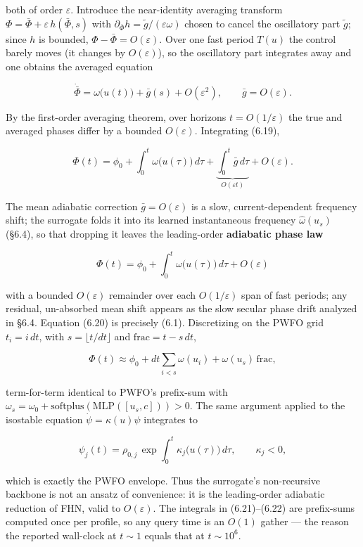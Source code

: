 \documentclass[
  11pt,
]{article}
\providecommand{\lt}{<}
\providecommand{\gt}{>}
\begin{document}
both of order \(\varepsilon\). Introduce the near-identity averaging
transform \(\Phi=\bar\Phi+\varepsilon\,h(\bar\Phi,s)\) with
\(\partial_{\bar\Phi}h=\tilde g/(\varepsilon\omega)\) chosen to cancel
the oscillatory part \(\tilde g\); since \(h\) is bounded,
\(\Phi-\bar\Phi=O(\varepsilon)\). Over one fast period \(T(u)\) the
control barely moves (it changes by \(O(\varepsilon)\)), so the
oscillatory part integrates away and one obtains the averaged equation

\[
\dot{\bar\Phi}=\omega\big(u(t)\big)+\bar g(s)+O(\varepsilon^2),\qquad \bar g=O(\varepsilon).
\tag{6.19}
\]

By the first-order averaging theorem, over horizons
\(t=O(1/\varepsilon)\) the true and averaged phases differ by a bounded
\(O(\varepsilon)\). Integrating (6.19),

\[
\Phi(t)=\phi_0+\int_0^t\omega\big(u(\tau)\big)\,d\tau
+\underbrace{\int_0^t\bar g\,d\tau}_{O(\varepsilon t)}+O(\varepsilon).
\]

The mean adiabatic correction \(\bar g=O(\varepsilon)\) is a slow,
current-dependent frequency shift; the surrogate folds it into its
learned instantaneous frequency \(\hat\omega(u_s)\) (§6.4), so that
dropping it leaves the leading-order \textbf{adiabatic phase law}

\[
\boxed{\ \Phi(t)=\phi_0+\int_0^t \omega\big(u(\tau)\big)\,d\tau+O(\varepsilon)\ }
\tag{6.20}
\]

with a bounded \(O(\varepsilon)\) remainder over each
\(O(1/\varepsilon)\) span of fast periods; any residual, un-absorbed
mean shift appears as the slow secular phase drift analyzed in §6.4.
Equation (6.20) is precisely (6.1). Discretizing on the PWFO grid
\(t_i=i\,dt\), with \(s=\lfloor t/dt\rfloor\) and
\(\mathrm{frac}=t-s\,dt\),

\[
\Phi(t)\approx\phi_0+dt\sum_{i\lt s}\omega(u_i)+\omega(u_s)\,\mathrm{frac},
\tag{6.21}
\]

term-for-term identical to PWFO's prefix-sum with
\(\omega_s=\omega_0+\mathrm{softplus}(\mathrm{MLP}([u_s,c]))\gt 0\). The
same argument applied to the isostable equation
\(\dot\psi=\kappa(u)\psi\) integrates to

\[
\psi_j(t)=\rho_{0,j}\,\exp\!\int_0^t\kappa_j\big(u(\tau)\big)\,d\tau,\qquad \kappa_j\lt 0,
\tag{6.22}
\]

which is exactly the PWFO envelope. Thus the surrogate's non-recursive
backbone is not an ansatz of convenience: it is the leading-order
adiabatic reduction of FHN, valid to \(O(\varepsilon)\). The integrals
in (6.21)--(6.22) are prefix-sums computed once per profile, so any
query time is an \(O(1)\) gather --- the reason the reported wall-clock
at \(t\sim1\) equals that at \(t\sim10^6\).
\end{document}
